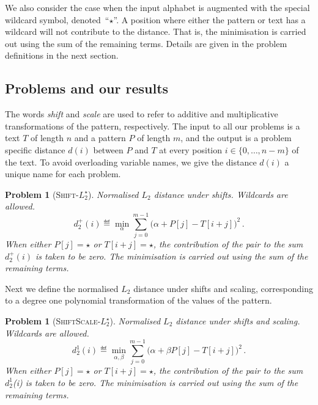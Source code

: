 \documentclass[11pt]{article}
\newcommand{\wildcard}{\ensuremath{\star}\xspace}
\newcommand{\sLtwoWild}{\textsc{Shift-$L_2^\wildcard$}\xspace}
\newcommand{\DsLtwoWild}{\ensuremath{d_2^+}}
\newcommand{\ssLtwoWild}{\textsc{ShiftScale-$L_2^\wildcard$}\xspace}
\newcommand{\DssLtwoWild}{\ensuremath{d_2^{1}}}
\theoremstyle{plain}
\newtheorem{problem}[theorem]{Problem}
\theoremstyle{definition}
\begin{document}
We also consider the case when the input alphabet is augmented with the special wildcard symbol, denoted~``\wildcard''. A position where either the pattern or text has a wildcard will not contribute to the distance. That is, the minimisation is carried out using the sum of the remaining terms. Details are given in the problem definitions in the next section.



\subsection{Problems and our results}\label{sec:problems}

The words \emph{shift} and \emph{scale} are used to refer to additive and multiplicative transformations of the pattern, respectively. The input to all our problems is a text $T$ of length $n$ and a pattern $P$ of length $m$, and the output is a problem specific distance $d(i)$ between $P$ and $T$ at every position $i\in\{0,\ldots,n-m\}$ of the text. To avoid overloading variable names, we give the distance $d(i)$ a unique name for each problem.

\begin{problem}[\sLtwoWild]
    \label{prob:sLtwoWild}
    Normalised $L_2$ distance under shifts. Wildcards are allowed.
\begin{equation*}
        \DsLtwoWild(i) \eqdef \min_{\alpha} \sum_{j=0}^{m-1} \big(\alpha + P[j] - T[i+j]\big)^2 \,.
    \end{equation*}
When either $P[j]=\wildcard$ or $T[i+j]=\wildcard$, the contribution of the pair to the sum $\DsLtwoWild(i)$ is taken to be zero. The minimisation is carried out using the sum of the remaining terms.
\end{problem}

Next we define the normalised $L_2$ distance under shifts and scaling, corresponding to a degree one polynomial transformation of the values of the pattern.

\begin{problem}[\ssLtwoWild]
    Normalised $L_2$ distance under shifts and scaling. Wildcards are allowed.
\begin{equation*}
        \DssLtwoWild(i) \eqdef \min_{\alpha,\beta} \sum_{j=0}^{m-1} \big(\alpha + \beta P[j] - T[i+j]\big)^2 \,.
    \end{equation*}
When either $P[j]=\wildcard$ or $T[i+j]=\wildcard$, the contribution of the pair to the sum \DssLtwoWild(i) is taken to be zero. The minimisation is carried out using the sum of the remaining terms.
\end{problem}
\end{document}
